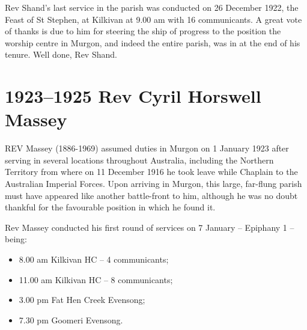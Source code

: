 Rev Shand's last service in the parish was conducted on 26 December 1922, the Feast of St Stephen, at Kilkivan at 9.00 am with 16 communicants. A great vote of thanks is due to him for steering the ship of progress to the position the worship centre in Murgon, and indeed the entire parish, was in at the end of his tenure. Well done, Rev Shand.



\begin{quote}

\end{quote}



\balance


\printendnotes[custom]
\setcounter{endnote}{0}
\chapter{1923--1925 Rev Cyril Horswell Massey}
\nobalance


\lettrine[lines=3]{R}{EV}
 Massey (1886-1969) assumed duties in Murgon on 1 January 1923 after serving in several locations throughout Australia, including the Northern Territory from where on 11 December 1916 he took leave while Chaplain to the Australian Imperial Forces. Upon arriving in Murgon, this large, far-flung parish must have appeared like another battle-front to him, although he was no doubt thankful for the favourable position in which he found it.

Rev Massey conducted his first round of services on 7 January -- Epiphany 1 -- being:



\begin{itemize}

\item

  8.00 am Kilkivan HC -- 4 communicants;

\item

  11.00 am Kilkivan HC -- 8 communicants;

\item

  3.00 pm Fat Hen Creek Evensong;

\item

  7.30 pm Goomeri Evensong.

\end{itemize}



